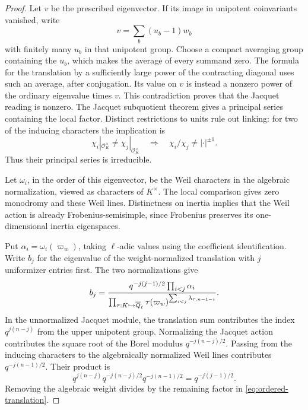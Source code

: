 \begin{proof}
Let \(v\) be the prescribed eigenvector. If its image in
unipotent coinvariants vanished, write
\[
                   v=\sum_b (u_b-1)w_b
\]
with finitely many \(u_b\) in that unipotent group. Choose a
compact averaging group containing the \(u_b\), which makes the
average of every summand zero. The formula for the translation
by a sufficiently large power of the contracting diagonal uses
such an average, after conjugation. Its value on \(v\) is
instead a nonzero power of the ordinary eigenvalue times \(v\).
This contradiction proves that the Jacquet reading is nonzero. The Jacquet subquotient theorem gives a principal
series containing the local factor. Distinct restrictions to units rule out linking: for two of the inducing characters the implication is
\[
 \chi_i|_{\mathcal O_K^\times}\ne\chi_j|_{\mathcal O_K^\times}\quad\Longrightarrow\quad\chi_i/\chi_j\ne|\cdot|^{\pm1}.
\]
Thus their principal series is irreducible.

Let \(\omega_i\), in the order of this eigenvector,
be the Weil characters in the algebraic normalization, viewed
as characters of \(K^\times\). The local comparison gives zero
monodromy and these Weil lines. Distinctness on inertia implies
that the Weil action is already Frobenius-semisimple, since
Frobenius preserves its one-dimensional inertia eigenspaces.

Put \(\alpha_i=\omega_i(\varpi_w)\), taking \(\ell\)-adic values
using the coefficient identification. Write \(b_j\) for the
eigenvalue of the weight-normalized translation with
\(j\) uniformizer entries first. The two normalizations give
\begin{equation}\label{eq:ordered-translation}
 b_j
   =\frac{q^{-j(j-1)/2}\prod_{i<j}\alpha_i}
           {\prod_{\tau:K\hookrightarrow\overline{Q}_\ell}
                   \tau(\varpi_w)^{\sum_{i<j}\lambda_{\tau,n-1-i}}}.
\end{equation}
In the unnormalized Jacquet module, the translation sum
contributes the index \(q^{j(n-j)}\) from the upper unipotent
group. Normalizing the Jacquet action contributes the square
root of the Borel modulus \(q^{-j(n-j)/2}\). Passing from the
inducing characters to the algebraically normalized Weil lines
contributes \(q^{-j(n-1)/2}\). Their product is
\[
       q^{j(n-j)}q^{-j(n-j)/2}q^{-j(n-1)/2}
                     =q^{-j(j-1)/2}.
\]
Removing the algebraic weight divides by the remaining
factor in \eqref{eq:ordered-translation}.
\end{proof}

